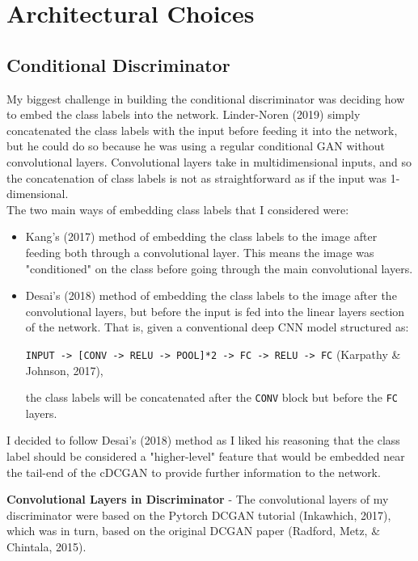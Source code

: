 \documentclass[11pt]{article}
\begin{document}
\section{Architectural Choices}\label{architectural-choices}

\subsection{Conditional
Discriminator}\label{conditional-discriminator}

My biggest challenge in building the conditional discriminator was
deciding how to embed the class labels into the network. Linder-Noren
(2019) simply concatenated the class labels with the input before
feeding it into the network, but he could do so because he was using a
regular conditional GAN without convolutional layers. Convolutional
layers take in multidimensional inputs, and so the concatenation of
class labels is not as straightforward as if the input was
1-dimensional.\\

The two main ways of embedding class labels that I considered were:

\begin{itemize}
\item
  Kang's (2017) method of embedding the class labels to the image after
  feeding both through a convolutional layer. This means the image was
  "conditioned" on the class before going through the main convolutional
  layers.
\item
  Desai's (2018) method of embedding the class labels to the image after
  the convolutional layers, but before the input is fed into the linear
  layers section of the network. That is, given a conventional deep CNN
  model structured as:
  
  \texttt{INPUT\ -\textgreater{}\ {[}CONV\ -\textgreater{}\ RELU\ -\textgreater{}\ POOL{]}*2\ -\textgreater{}\ FC\ -\textgreater{}\ RELU\ -\textgreater{}\ FC}
  (Karpathy \& Johnson, 2017),
  
   the class labels will be concatenated
  after the \texttt{CONV} block but before the \texttt{FC} layers.
\end{itemize}

I decided to follow Desai's (2018) method as I liked his reasoning that
the class label should be considered a "higher-level" feature that would
be embedded near the tail-end of the cDCGAN to provide
further information to the network.

\textbf{Convolutional Layers in Discriminator} - The convolutional
layers of my discriminator were based on the Pytorch DCGAN tutorial
(Inkawhich, 2017), which was in turn, based on the original DCGAN paper
(Radford, Metz, \& Chintala, 2015).\\
\end{document}
